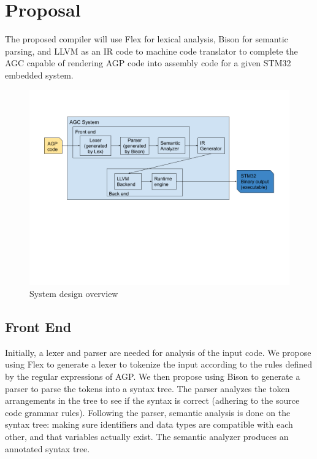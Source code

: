 \documentclass[11pt]{article}
\begin{document}
\section{Proposal}

The proposed compiler will use Flex for lexical analysis, Bison for semantic parsing, and  LLVM as an IR code to machine code translator to complete the AGC capable of rendering AGP code into assembly code for a given STM32 embedded system. 



\begin{figure}[hbt]
   \begin{center}
     \includegraphics[width=170mm]{figure1.png}
   \end{center}
  \caption{System design overview}
  \label{fig-sysdesov}
  \end{figure}



\subsection{Front End}

Initially, a lexer and parser are needed for analysis of the input code. We propose using Flex to generate a lexer to tokenize the input according to the rules defined by the regular expressions of AGP. We then propose using Bison to generate a parser to parse the tokens into a syntax tree. The parser analyzes the token arrangements in the tree to see if the syntax is correct (adhering to the source code grammar rules). Following the parser, semantic analysis is done  on the syntax tree: making sure identifiers and data types are compatible with each other, and that variables actually exist. The semantic analyzer produces an annotated syntax tree.
\end{document}
